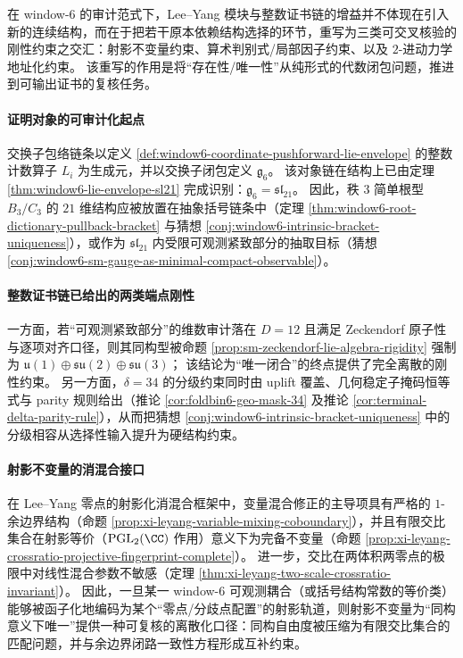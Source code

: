\begin{remark}\label{rem:window6-leyang-integer-audit-triple-rigidity}
在 window-\(6\) 的审计范式下，Lee--Yang 模块与整数证书链的增益并不体现在引入新的连续结构，而在于把若干原本依赖结构选择的环节，重写为三类可交叉核验的刚性约束之交汇：射影不变量约束、算术判别式/局部因子约束、以及 \(2\)-进动力学地址化约束。
该重写的作用是将“存在性/唯一性”从纯形式的代数闭包问题，推进到可输出证书的复核任务。

\paragraph{证明对象的可审计化起点}
交换子包络链条以定义 \ref{def:window6-coordinate-pushforward-lie-envelope} 的整数计数算子 \(L_i\) 为生成元，并以交换子闭包定义 \(\mathfrak g_6\)。
该对象链在结构上已由定理 \ref{thm:window6-lie-envelope-sl21} 完成识别：\(\mathfrak g_6=\mathfrak{sl}_{21}\)。
因此，秩 \(3\) 简单根型 \(B_3/C_3\) 的 \(21\) 维结构应被放置在抽象括号链条中（定理 \ref{thm:window6-root-dictionary-pullback-bracket} 与猜想 \ref{conj:window6-intrinsic-bracket-uniqueness}），或作为 \(\mathfrak{sl}_{21}\) 内受限可观测紧致部分的抽取目标（猜想 \ref{conj:window6-sm-gauge-as-minimal-compact-observable}）。

\paragraph{整数证书链已给出的两类端点刚性}
一方面，若“可观测紧致部分”的维数审计落在 \(D=12\) 且满足 Zeckendorf 原子性与逐项对齐口径，则其同构型被命题 \ref{prop:sm-zeckendorf-lie-algebra-rigidity} 强制为
\(
\mathfrak u(1)\oplus\mathfrak{su}(2)\oplus\mathfrak{su}(3)
\)；
该结论为“唯一闭合”的终点提供了完全离散的刚性约束。
另一方面，\(\delta=34\) 的分级约束同时由 uplift 覆盖、几何稳定子掩码恒等式与 parity 规则给出（推论 \ref{cor:foldbin6-geo-mask-34} 及推论 \ref{cor:terminal-delta-parity-rule}），从而把猜想 \ref{conj:window6-intrinsic-bracket-uniqueness} 中的分级相容从选择性输入提升为硬结构约束。

\paragraph{射影不变量的消混合接口}
在 Lee--Yang 零点的射影化消混合框架中，变量混合修正的主导项具有严格的 \(1\)-余边界结构（命题 \ref{prop:xi-leyang-variable-mixing-coboundary}），并且有限交比集合在射影等价（\(\mathrm{PGL}_2(\CC)\) 作用）意义下为完备不变量（命题 \ref{prop:xi-leyang-crossratio-projective-fingerprint-complete}）。
进一步，交比在两体积两零点的极限中对线性混合参数不敏感（定理 \ref{thm:xi-leyang-two-scale-crossratio-invariant}）。
因此，一旦某一 window-\(6\) 可观测耦合（或括号结构常数的等价类）能够被函子化地编码为某个“零点/分歧点配置”的射影轨道，则射影不变量为“同构意义下唯一”提供一种可复核的离散化口径：同构自由度被压缩为有限交比集合的匹配问题，并与余边界闭路一致性方程形成互补约束。


\end{remark}
